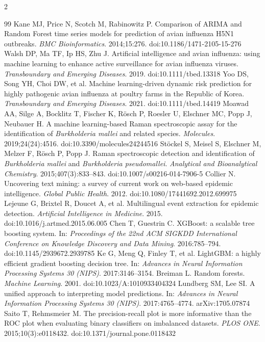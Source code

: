 \documentclass[10pt,openany]{report}
\begin{document}
\begin{multicols}{2}
\begin{thebibliography}{99}
 Kane MJ, Price N, Scotch M, Rabinowitz P. Comparison of ARIMA and Random Forest time series models for prediction of avian influenza H5N1 outbreaks. \emph{BMC Bioinformatics}. 2014;15:276. doi:10.1186/1471-2105-15-276
 Walsh DP, Ma TF, Ip HS, Zhu J. Artificial intelligence and avian influenza: using machine learning to enhance active surveillance for avian influenza viruses. \emph{Transboundary and Emerging Diseases}. 2019. doi:10.1111/tbed.13318
 Yoo DS, Song YH, Choi DW, et al. Machine learning-driven dynamic risk prediction for highly pathogenic avian influenza at poultry farms in the Republic of Korea. \emph{Transboundary and Emerging Diseases}. 2021. doi:10.1111/tbed.14419
 Moawad AA, Silge A, Bocklitz T, Fischer K, R\"osch P, Roesler U, Elschner MC, Popp J, Neubauer H. A machine learning-based Raman spectroscopic assay for the identification of \emph{Burkholderia mallei} and related species. \emph{Molecules}. 2019;24(24):4516. doi:10.3390/molecules24244516
 St\"ockel S, Meisel S, Elschner M, Melzer F, R\"osch P, Popp J. Raman spectroscopic detection and identification of \emph{Burkholderia mallei} and \emph{Burkholderia pseudomallei}. \emph{Analytical and Bioanalytical Chemistry}. 2015;407(3):833--843. doi:10.1007/s00216-014-7906-5
 Collier N. Uncovering text mining: a survey of current work on web-based epidemic intelligence. \emph{Global Public Health}. 2012. doi:10.1080/17441692.2012.699975
 Lejeune G, Brixtel R, Doucet A, et al. Multilingual event extraction for epidemic detection. \emph{Artificial Intelligence in Medicine}. 2015. doi:10.1016/j.artmed.2015.06.005
 Chen T, Guestrin C. XGBoost: a scalable tree boosting system. In: \emph{Proceedings of the 22nd ACM SIGKDD International Conference on Knowledge Discovery and Data Mining}. 2016:785--794. doi:10.1145/2939672.2939785
 Ke G, Meng Q, Finley T, et al. LightGBM: a highly efficient gradient boosting decision tree. In: \emph{Advances in Neural Information Processing Systems 30 (NIPS)}. 2017:3146--3154.
 Breiman L. Random forests. \emph{Machine Learning}. 2001. doi:10.1023/A:1010933404324
 Lundberg SM, Lee SI. A unified approach to interpreting model predictions. In: \emph{Advances in Neural Information Processing Systems 30 (NIPS)}. 2017:4765--4774. arXiv:1705.07874
 Saito T, Rehmsmeier M. The precision-recall plot is more informative than the ROC plot when evaluating binary classifiers on imbalanced datasets. \emph{PLOS ONE}. 2015;10(3):e0118432. doi:10.1371/journal.pone.0118432

\end{thebibliography}
\end{multicols}
\end{document}
